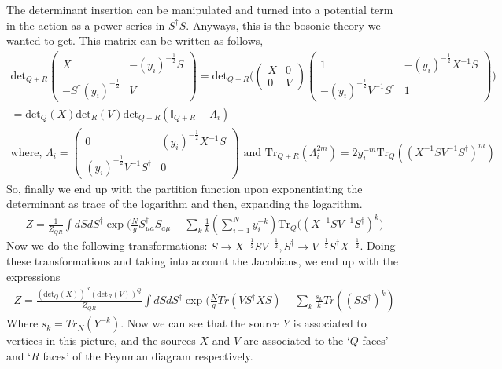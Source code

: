 \documentclass[english]{article}
\newcommand{\inv}{\frac{1}}
\newcommand{\half}{\frac{1}{2}}
\renewcommand{\>}{\rangle}
\newcommand{\<}{\langle}
\renewcommand{\(}{\left(}
\renewcommand{\)}{\right)}
\begin{document}
The determinant insertion can be manipulated and turned into a potential term in the action as 
a power series in $ S^\dagger  S$. Anyways, this is the bosonic theory we wanted to get. This matrix can be written as follows,
\begin{align}
    \text{det}_{Q+R}\begin{pmatrix}
    X & -(y_i)^{-\half} S\\ 
    - S^{\dagger}(y_{i})^{-\half}& V
\end{pmatrix}=\text{det}_{Q+R}\bigg(\begin{pmatrix}
    X& 0\\ 
    0& V
\end{pmatrix}\begin{pmatrix}
    1&-(y_i)^{-\half} X^{-1} S \\ -(y_i)^{-\half}V^{-1} S^{\dagger}&1
\end{pmatrix}\bigg)\nonumber\\
=\text{det}_{Q}(X)\text{det}_R(V)\text{det}_{Q+R}(\mathbb{I}_{Q+R}-\Lambda_i)\\
\text{where,  }
    \Lambda_i=\begin{pmatrix}
    0&(y_i)^{-\half} X^{-1} S \\ (y_i)^{-\half}V^{-1} S^{\dagger}&0
\end{pmatrix}\text{ and } \text{Tr}_{Q+R}(\Lambda_i^{2m})=2y_i^{-m}\text{Tr}_Q((X^{-1} S V^{-1} S^{\dagger})^m)
\end{align}
So, finally we end up with the partition function upon exponentiating the determinant as trace of the logarithm and then, expanding the logarithm.
\begin{align} 
Z = \frac{1}{Z_{QR}}  \int d S d S^{\dagger} \exp\bigg(\frac{N}{g} S^{\dagger}_{\mu a}S_{a\mu} - \sum_k \inv{k} (\sum_{i=1}^N y_i^{-k}) \text{Tr}_Q((X^{-1} S V^{-1} S^{\dagger})^k\bigg)
\end{align} 
Now we do the following transformations: $ S \to X^{-\half}  S V^{-\half},  S^{\dagger} \to  V^{-\half} S^{\dagger} X^{-\half} $. Doing these transformations and taking into account the Jacobians, we end up with the expressions
\begin{align} 
Z = \frac{(\text{det}_Q(X))^{R}(\text{det}_{R}(V))^{Q}}{Z_{QR}} \int d S d S^{\dagger} \exp(\frac{N}{g}Tr(V S^{\dagger} X S) - \sum_k  \frac{s_k}{k} Tr(( S S^{\dagger})^k)
\end{align}
Where $s_k =  Tr_{N}(Y^{-k})$. Now we can see that the source $Y$ is associated to vertices in this picture, and the sources $X$ and $V$ are associated to the `$Q$ faces' and `$R$ faces' of the Feynman diagram respectively.
\end{document}
